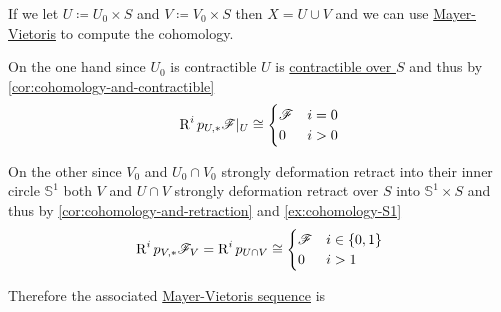 \documentclass[../../main]{subfiles}
\begin{document}
\begin{example}[\(\mathbb{RP}^{2}\)]
  If we let \(U \coloneq U_{0} \times S\) and \(V \coloneq V_{0} \times S\) then \(X = U \cup V\) and we can use \hyperref[thm:mayer-vietoris-open]{Mayer-Vietoris} to compute the cohomology.

  On the one hand since \(U_{0}\) is contractible \(U\) is \hyperref[def:homotopy-over]{contractible over \(S\)} and thus by \autoref{cor:cohomology-and-contractible}
  \begin{equation*}
    \operatorname{R}^{i}p_{U, \ast} \mathscr{F}|_{U} \cong \begin{cases}
      \mathscr{F} & i = 0 \\
      0 & i > 0
    \end{cases}
  \end{equation*}

  On the other since \(V_{0}\) and \(U_{0} \cap V_{0}\) strongly deformation retract into their inner circle \(\mathbb{S}^{1}\) both \(V\) and \(U \cap V\) strongly deformation retract over \(S\) into \(\mathbb{S}^{1} \times S\) and thus by \autoref{cor:cohomology-and-retraction} and \autoref{ex:cohomology-S1}
  \begin{equation*}
    \operatorname{R}^{i}p_{V, \ast} \mathscr{F}_{V} = \operatorname{R}^{i}p_{U \cap V} \cong \begin{cases}
      \mathscr{F} & i \in \{0, 1\} \\
      0 & i > 1
    \end{cases}
  \end{equation*}

  Therefore the associated \hyperref[thm:mayer-vietoris-open]{Mayer-Vietoris sequence} is
  \begin{center}
  \end{center}


\end{example}
\end{document}
